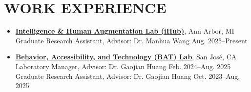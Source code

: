 \documentclass[11pt]{article}
\begin{document}
\vspace{0.6em}

\section*{WORK EXPERIENCE}
\begin{itemize}[leftmargin=*, topsep=0pt, itemsep=6pt]
  \item \href{https://ihub.engin.umich.edu/}{\textbf{Intelligence \& Human Augmentation Lab (iHub)}}, Ann Arbor, MI\\
  Graduate Research Assistant, Advisor: Dr. Manhua Wang \hfill Aug. 2025--Present
  
  \item \href{https://batlab.info/}{\textbf{Behavior, Accessibility, and Technology (BAT) Lab}}, San José, CA\\
  Laboratory Manager, Advisor: Dr. Gaojian Huang \hfill Feb. 2024--Aug. 2025\\
  Graduate Research Assistant, Advisor: Dr. Gaojian Huang \hfill Oct. 2023--Aug. 2025
\end{itemize}
\end{document}
